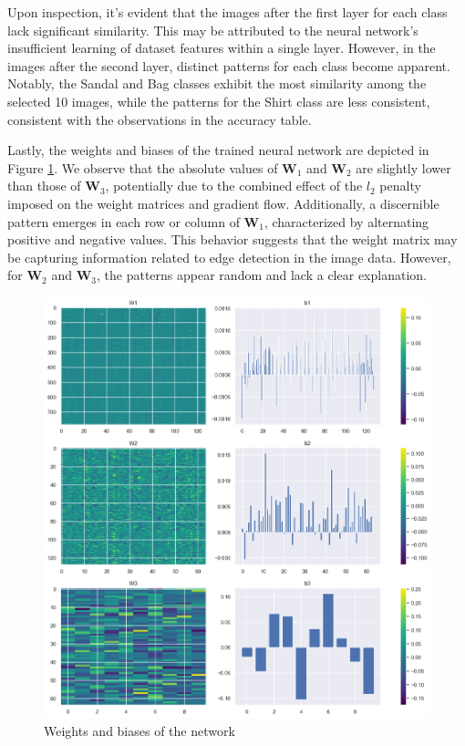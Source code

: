 \documentclass[10pt,a4paper,twoside]{tau}
\renewcommand{\vec}[1]{\mathbf{#1}}
\begin{document}
Upon inspection, it's evident that the images after the first layer for each class lack significant similarity. This may be attributed to the neural network's insufficient learning of dataset features within a single layer. However, in the images after the second layer, distinct patterns for each class become apparent. Notably, the Sandal and Bag classes exhibit the most similarity among the selected 10 images, while the patterns for the Shirt class are less consistent, consistent with the observations in the accuracy table.

Lastly, the weights and biases of the trained neural network are depicted in Figure \ref{fig:weight-biases}. We observe that the absolute values of $\vec{W}_1$ and $\vec{W}_2$ are slightly lower than those of $\vec{W}_3$, potentially due to the combined effect of the $l_2$ penalty imposed on the weight matrices and gradient flow. Additionally, a discernible pattern emerges in each row or column of $\vec{W}_1$, characterized by alternating positive and negative values. This behavior suggests that the weight matrix may be capturing information related to edge detection in the image data. However, for $\vec{W}_2$ and $\vec{W}_3$, the patterns appear random and lack a clear explanation.

\begin{figure}[]
\centering
\includegraphics[scale=0.3]{images/weight_biases.png}
\caption{Weights and biases of the network}
\label{fig:weight-biases}
\end{figure}
\end{document}
